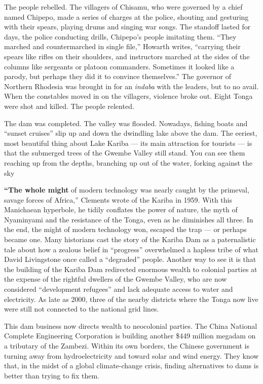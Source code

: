 The people rebelled. The villagers of Chisamu, who were governed by a
chief named Chipepo, made a series of charges at the police, shouting
and gesturing with their spears, playing drums and singing war songs.
The standoff lasted for days, the police conducting drills, Chipepo's
people imitating them. ``They marched and countermarched in single
file,'' Howarth writes, ``carrying their spears like rifles on their
shoulders, and instructors marched at the sides of the columns like
sergeants or platoon commanders. Sometimes it looked like a parody, but
perhaps they did it to convince themselves.'' The governor of Northern
Rhodesia was brought in for an \emph{indaba} with the leaders, but to no
avail. When the constables moved in on the villagers, violence broke
out. Eight Tonga were shot and killed. The people relented.

The dam was completed. The valley was flooded. Nowadays, fishing boats
and ``sunset cruises'' slip up and down the dwindling lake above the
dam. The eeriest, most beautiful thing about Lake Kariba --- its main
attraction for tourists --- is that the submerged trees of the Gwembe
Valley still stand. You can see them reaching up from the depths,
branching up out of the water, forking against the sky

\textbf{``The whole might} of modern technology was nearly caught by the
primeval, savage forces of Africa,'' Clements wrote of the Kariba in
1959. With this Manichaean hyperbole, he tidily conflates the power of
nature, the myth of Nyaminyami and the resistance of the Tonga, even as
he diminishes all three. In the end, the might of modern technology won,
escaped the trap --- or perhaps became one. Many historians cast the
story of the Kariba Dam as a paternalistic tale about how a zealous
belief in ``progress'' overwhelmed a hapless tribe of what David
Livingstone once called a ``degraded'' people. Another way to see it is
that the building of the Kariba Dam redirected enormous wealth to
colonial parties at the expense of the rightful dwellers of the Gwembe
Valley, who are now considered ``development refugees'' and lack
adequate access to water and electricity. As late as 2000, three of the
nearby districts where the Tonga now live were still not connected to
the national grid lines.

This dam business now directs wealth to neocolonial parties. The China
National Complete Engineering Corporation is building another \$449
million megadam on a tributary of the Zambezi. Within its own borders,
the Chinese government is turning away from hydroelectricity and toward
solar and wind energy. They know that, in the midst of a global
climate-change crisis, finding alternatives to dams is better than
trying to fix them.

